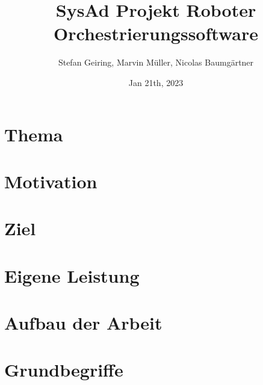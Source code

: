 \documentclass[11pt,oneside,a4paper,titlepage]{article}
\title{{SysAd Projekt Roboter Orchestrierungssoftware}}
\author{Stefan Geiring, Marvin Müller, Nicolas Baumgärtner}
\date{Jan 21th, 2023}
\begin{document}
\setlength{\parindent}{0pt}






\newpage

\pagestyle{fancy}


\tableofcontents

\fancyhead[RO,LE]{\nouppercase{\leftmark}}
\fancyfoot[RO,LE]{\thepage}

\renewcommand{\headrulewidth}{0.5pt}

\setcounter{page}{1}

\newpage



\section{Thema}


\section{Motivation}


\section{Ziel}


\section{Eigene Leistung}


\section{Aufbau der Arbeit}

\pagebreak

\section{Grundbegriffe}

\pagebreak
\end{document}
